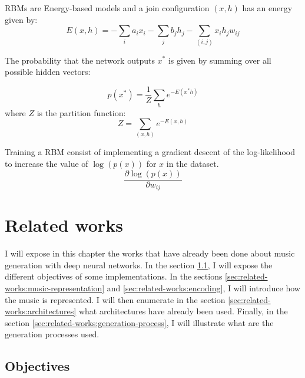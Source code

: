 \documentclass[12pt]{report}
\begin{document}
RBMs are Energy-based models and a join configuration $(x, h)$ has an energy given by:
\begin{equation}
    E(x, h) = -\sum_i a_i x_i - \sum_j b_j h_j - \sum_{(i, j)} x_i h_j w_{ij}
\end{equation}

The probability that the network outputs $x^{*}$ is given by summing over all possible hidden vectors:

\begin{equation}
    p(x^{*}) = \frac{1}{Z} \sum_h e^{- E(x^{*} h)}
\end{equation}
where $Z$ is the partition function:
\begin{equation}
    Z = \sum_{(x,h)} e^{- E(x, h)}
\end{equation}

Training a RBM consist of implementing a gradient descent of the log-likelihood to increase the value of $\log(p(x))$ for $x$ in the dataset.
\begin{equation*}
    \frac{\partial \log(p(x))}{\partial w_{ij}}
\end{equation*}



\chapter{Related works}
\label{chap:related-works}

I will expose in this chapter the works that have already been done about music generation with deep neural networks.
In the section \ref{sec:related-works:objectives}, I will expose the different objectives of some implementations.
In the sections \ref{sec:related-works:music-representation} and \ref{sec:related-works:encoding}, I will introduce how the music is represented.
I will then enumerate in the section \ref{sec:related-works:architectures} what architectures have already been used. 
Finally, in the section \ref{sec:related-works:generation-process}, I will illustrate what are the generation processes used.


\section{Objectives}        %
\label{sec:related-works:objectives}
\end{document}

